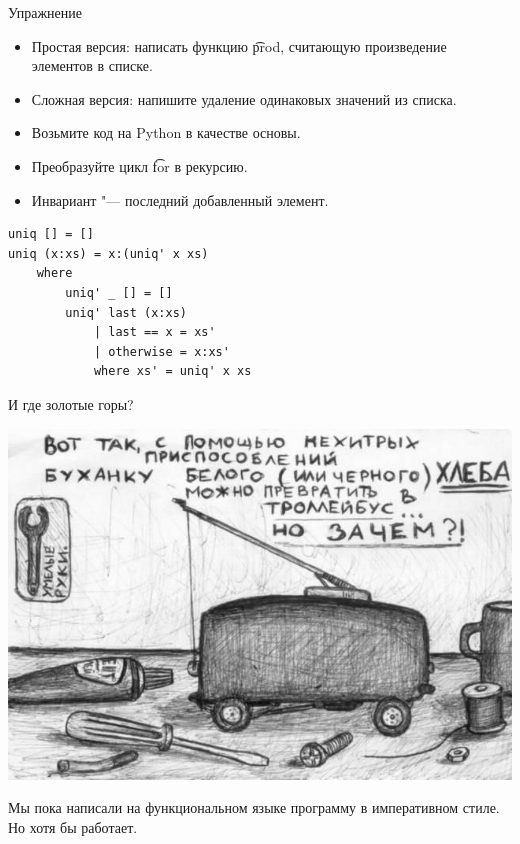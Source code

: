 \begin{frame}[t, fragile]{Упражнение}
	\begin{itemize}
		\item Простая версия: написать функцию \t{prod}, считающую произведение элементов в списке.
		\item Сложная версия: напишите удаление одинаковых значений из списка.
		\item Возьмите код на Python в качестве основы.
		\item Преобразуйте цикл \t{for} в рекурсию. \pause
		\item Инвариант "--- последний добавленный элемент.
	\end{itemize}
	\pause
\begin{verbatim}
uniq [] = []
uniq (x:xs) = x:(uniq' x xs)
    where
        uniq' _ [] = []
        uniq' last (x:xs)
            | last == x = xs'
            | otherwise = x:xs'
            where xs' = uniq' x xs
\end{verbatim}
\end{frame}

\begin{frame}{И где золотые горы?}
	\begin{center}
		\includegraphics[scale=0.35]{bread-why.jpg}
	\end{center}
	Мы пока написали на функциональном языке программу в императивном стиле.
	Но хотя бы работает.
\end{frame}

